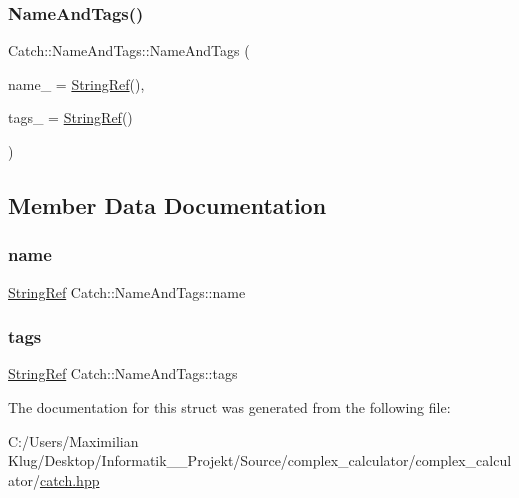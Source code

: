 \subsubsection{\texorpdfstring{Name\+And\+Tags()}{NameAndTags()}}
{\footnotesize\ttfamily Catch\+::\+Name\+And\+Tags\+::\+Name\+And\+Tags (\begin{DoxyParamCaption}\item[{\mbox{\hyperlink{class_catch_1_1_string_ref}{String\+Ref}} const \&}]{name\+\_\+ = {\ttfamily \mbox{\hyperlink{class_catch_1_1_string_ref}{String\+Ref}}()},  }\item[{\mbox{\hyperlink{class_catch_1_1_string_ref}{String\+Ref}} const \&}]{tags\+\_\+ = {\ttfamily \mbox{\hyperlink{class_catch_1_1_string_ref}{String\+Ref}}()} }\end{DoxyParamCaption})\hspace{0.3cm}{\ttfamily [noexcept]}}



\subsection{Member Data Documentation}
\mbox{\label{struct_catch_1_1_name_and_tags_a7cbea60e0cebfa622c667008eb011420}} 
\subsubsection{\texorpdfstring{name}{name}}
{\footnotesize\ttfamily \mbox{\hyperlink{class_catch_1_1_string_ref}{String\+Ref}} Catch\+::\+Name\+And\+Tags\+::name}

\mbox{\label{struct_catch_1_1_name_and_tags_a74062ed1138834a348424eb7ed900c57}} 
\subsubsection{\texorpdfstring{tags}{tags}}
{\footnotesize\ttfamily \mbox{\hyperlink{class_catch_1_1_string_ref}{String\+Ref}} Catch\+::\+Name\+And\+Tags\+::tags}



The documentation for this struct was generated from the following file\+:\begin{DoxyCompactItemize}
\item 
C\+:/\+Users/\+Maximilian Klug/\+Desktop/\+Informatik\+\_\+\_\+\+Projekt/\+Source/complex\+\_\+calculator/complex\+\_\+calculator/\mbox{\hyperlink{catch_8hpp}{catch.\+hpp}}\end{DoxyCompactItemize}
